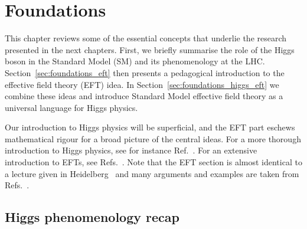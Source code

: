  




\chapter{Foundations}
\label{chapter:foundations}

This chapter reviews some of the essential concepts that underlie the
research presented in the next chapters. First, we briefly summarise
the role of the Higgs boson in the Standard Model (SM) and its
phenomenology at the LHC.  Section~\ref{sec:foundations_eft} then
presents a pedagogical introduction to the effective field theory
(EFT) idea. In Section~\ref{sec:foundations_higgs_eft} we combine
these ideas and introduce Standard Model effective field theory as a
universal language for Higgs physics.

Our introduction to Higgs physics will be superficial, and the EFT
part eschews mathematical rigour for a broad picture of the central
ideas. For a more thorough introduction to Higgs physics, see for
instance Ref.~\cite{Plehn:2009nd}. For an extensive introduction to
EFTs, see Refs.~\cite{Georgi:1994qn,Kaplan:2005es}. Note that the EFT
section is almost identical to a lecture given in
Heidelberg~\cite{Brehmer:EFTlecture} and many arguments and examples
are taken from Refs.~\cite{Georgi:1994qn,Kaplan:2005es}.





\section{Higgs phenomenology recap}
\label{sec:foundations_Higgs}


